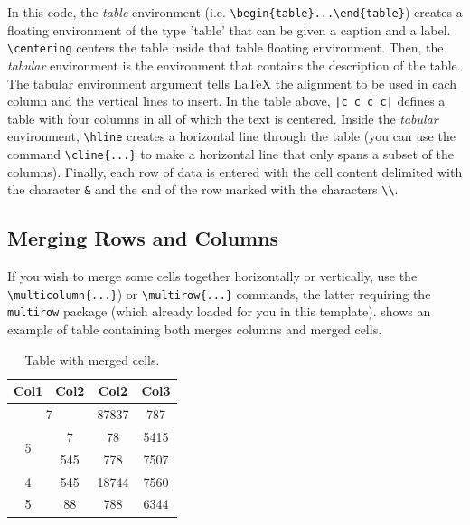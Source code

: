 In this code, the \emph{table} environment (i.e. \verb|\begin{table}...\end{table}|) creates a floating environment of the type 'table' that can be given a caption and a label. 
\verb|\centering| centers the table inside that table floating environment. 
Then, the \emph{tabular} environment is the environment that contains the description of the table. 
The tabular environment argument tells \LaTeX{} the alignment to be used in each column and the vertical lines to insert. 
In the table above, \verb!|c c c c|! defines a table with four columns in all of which the text is centered. 
Inside the \emph{tabular} environment, \verb|\hline| creates a horizontal line through the table (you can use the command \verb|\cline{...}| to make a horizontal line that only spans a subset of the columns). Finally, each row of data is entered with the cell content delimited with the character \verb|&| and the end of the row marked with the characters \verb|\\|.


\subsection{Merging Rows and Columns}
\label{sec:TableRowMerging}

If you wish to merge some cells together horizontally or vertically, use the \verb|\multicolumn{...}|) or \verb|\multirow{...}| commands, the latter requiring the \verb|multirow| package (which already loaded for you in this template).
 shows an example of table containing both merges columns and merged cells.

\begin{table}[!ht]
    \centering
    \caption{Table with merged cells.}
    \label{tab:MySecondTable}
    \begin{tabular}{|cccc|} 
    \hline
    Col1 & Col2 & Col2 & Col3 \\
    \hline
    \multicolumn{2}{|c}{7} & 87837 & 787 \\  
    \multirow{2}{*}{5} & 7 & 78 & 5415 \\ 
    & 545 & 778 & 7507 \\
    4 & 545 & 18744 & 7560 \\
    5 & 88 & 788 & 6344 \\
 \hline
 \end{tabular}
\end{table}

